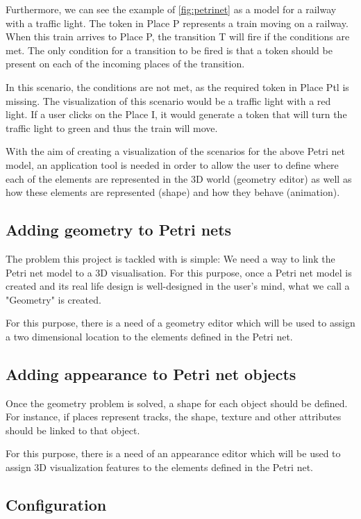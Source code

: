 Furthermore, we can see the example of \ref{fig:petrinet} as a model for a railway with a traffic light. The token in Place P represents a train moving on a railway. When this train arrives to Place P, the transition T will fire if the conditions are met. The only condition for a transition to be fired is that a token should be present on each of the incoming places of the transition.

In this scenario, the conditions are not met, as the required token in Place Ptl is missing. The visualization of this scenario would be a traffic light with a red light. If a user clicks on the Place I, it would generate a token that will turn the traffic light to green and thus the train will move.

With the aim of creating a visualization of the scenarios for the above Petri net model, an application tool is needed in order to allow the user to define where each of the elements are represented in the 3D world (geometry editor) as well as how these elements are represented (shape) and how they behave (animation). 

\subsection{Adding geometry to Petri nets}
The problem this project is tackled with is simple: We need a way to link the Petri net model to a 3D visualisation. For this purpose, once a Petri net model is created and its real life design is well-designed in the user's mind, what we call a "Geometry" is created.

For this purpose, there is a need of a geometry editor which will be used to assign a two dimensional location to the elements defined in the Petri net.

\subsection{Adding appearance to Petri net objects}
\label{sec:appearance}

Once the geometry problem is solved, a shape for each object should be defined. For instance, if places represent tracks, the shape, texture and other attributes should be linked to that object.

For this purpose, there is a need of an appearance editor which will be used to assign 3D visualization features to the elements defined in the Petri net.

\subsection{Configuration}


